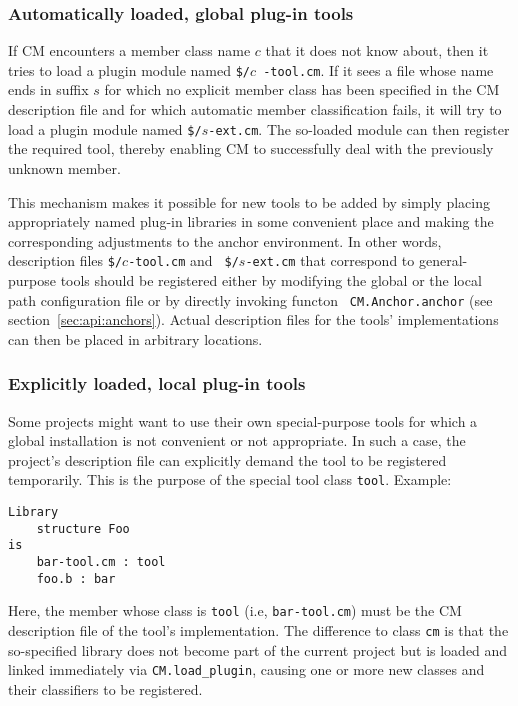 \subsubsection{Automatically loaded, global plug-in tools}

If CM encounters a member class name $c$ that it does not know about,
then it tries to load a plugin module named {\tt \$/}$c${\tt
-tool.cm}.  If it sees a file whose name ends in suffix $s$ for which
no explicit member class has been specified in the CM description file
and for which automatic member classification fails, it will try to
load a plugin module named {\tt \$/}$s${\tt -ext.cm}.  The so-loaded
module can then register the required tool, thereby enabling CM to
successfully deal with the previously unknown member.

This mechanism makes it possible for new tools to be added by simply
placing appropriately named plug-in libraries in some convenient place
and making the corresponding adjustments to the anchor environment.
In other words, description files {\tt \$/}$c${\tt -tool.cm} and {\tt
\$/}$s${\tt -ext.cm} that correspond to general-purpose tools should
be registered either by modifying the global or the local path
configuration file or by directly invoking functon {\tt
CM.Anchor.anchor} (see section~\ref{sec:api:anchors}).  Actual
description files for the tools' implementations can then be placed in
arbitrary locations.

\subsubsection{Explicitly loaded, local plug-in tools}
\label{sec:localtools}

Some projects might want to use their own special-purpose tools for
which a global installation is not convenient or not appropriate.  In
such a case, the project's description file can explicitly demand the
tool to be registered temporarily.  This is the purpose of the special
tool class {\tt tool}.  Example:

\begin{lstlisting}
Library
    structure Foo
is
    bar-tool.cm : tool
    foo.b : bar
\end{lstlisting}%

Here, the member whose class is {\tt tool} (i.e, {\tt bar-tool.cm})
must be the CM description file of the tool's implementation.  The
difference to class {\tt cm} is that the so-specified library does not
become part of the current project but is loaded and linked
immediately via {\tt CM.load\_plugin}, causing one or more new classes
and their classifiers to be registered.

